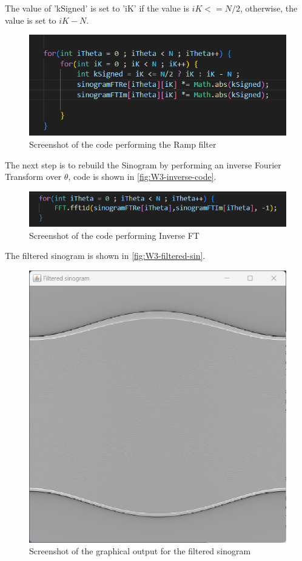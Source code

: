 The value of 'kSigned' is set to 'iK' if the value is $iK <= N/2$, otherwise, the value is set to $iK-N$.   
\begin{figure}[H] 
    \centering
    \includegraphics[width=0.9\columnwidth]{Figures/Week 3/ramp-filter-code.png}
    \caption{Screenshot of the code performing the Ramp filter}
    \label{fig:W3-ramp-code}
\end{figure}

The next step is to rebuild the Sinogram by performing an inverse Fourier Transform over \(\theta\), code is shown in \autoref{fig:W3-inverse-code}.

\begin{figure}[H] 
    \centering
    \includegraphics[width=0.9\columnwidth]{Figures/Week 3/inverse-FT.png}
    \caption{Screenshot of the code performing Inverse FT }
    \label{fig:W3-inverse-code}
\end{figure}

The filtered sinogram is shown in \autoref{fig:W3-filtered-sin}.
\begin{figure}[H] 
    \centering
    \includegraphics[width=0.9\columnwidth]{Figures/Week 3/filtered-sinorgram.png}
    \caption{Screenshot of the graphical output for the filtered sinogram}
    \label{fig:W3-filtered-sin}
\end{figure}

